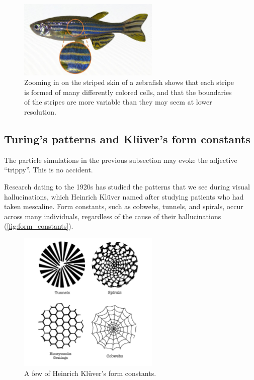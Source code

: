 \begin{figure}[h]
\centering
\mySfFamily
\includegraphics[width = 0.6\textwidth]{../images/zebrafish_zoom.jpg}
\caption{Zooming in on the striped skin of a zebrafish shows that each stripe is formed of many differently colored cells, and that the boundaries of the stripes are more variable than they may seem at lower resolution.}
\label{fig:zebrafish_zoom}
\end{figure}

\FloatBarrier
{}
\subsection{Turing's patterns and Klüver's form constants}

The particle simulations in the previous subsection may evoke the adjective ``trippy''. This is no accident.

Research dating to the 1920s has studied the patterns that we see during visual hallucinations, which Heinrich Klüver named  after studying patients who had taken mescaline. Form constants, such as cobwebs, tunnels, and spirals, occur across many individuals, regardless of the cause of their hallucinations (\autoref{fig:form_constants}).\\

\begin{figure}[h]
\centering
\mySfFamily
\includegraphics[width = 0.6\textwidth]{../images/form_constants.png}
\caption{A few of Heinrich Klüver's form constants.}
\label{fig:form_constants}
\end{figure}

